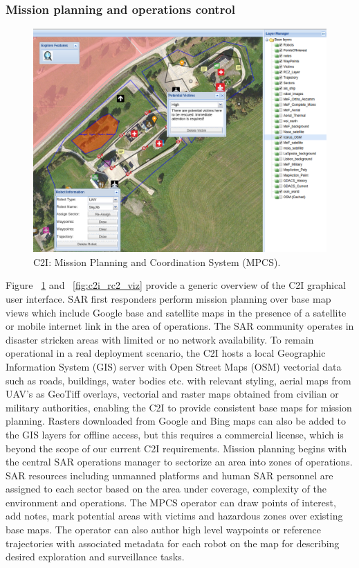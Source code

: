 \documentclass{article}
\begin{document}
\subsubsection{Mission planning and operations control}
\begin{figure} [h]
    \centering
    \includegraphics[width=\textwidth]{ROB-15-0035_fig6.png}
    \caption{C2I: Mission Planning and Coordination System (MPCS).}
    \label{fig:c2i_mpcs_viz}
\end{figure}
Figure ~\ref{fig:c2i_mpcs_viz} and ~\ref{fig:c2i_rc2_viz} provide a generic overview of the C2I graphical user interface.
SAR first responders perform mission planning over base map views which include Google base and satellite maps in the presence of a satellite or mobile internet link in the area of operations.
The SAR community operates in disaster stricken areas with limited or no network availability.
To remain operational in a real deployment scenario, the C2I hosts a local Geographic Information System (GIS) server with Open Street Maps (OSM) vectorial data such as roads, buildings, water bodies etc. with relevant styling, aerial maps from UAV's as GeoTiff overlays, vectorial and raster maps obtained from civilian or military authorities, enabling the C2I to provide consistent base maps for mission planning.
Rasters downloaded from Google and Bing maps can also be added to the GIS layers for offline access, but this requires a commercial license, which is beyond the scope of our current C2I requirements.
Mission planning begins with the central SAR operations manager to sectorize an area into zones of operations. SAR resources including unmanned platforms and human SAR personnel are assigned to each sector based on the area under coverage, complexity of the environment and operations. The MPCS operator can draw points of interest, add notes, mark potential areas with victims and hazardous zones over existing base maps. The operator can also author high level waypoints or reference trajectories with associated metadata for each robot on the map for describing desired exploration and surveillance tasks.
\end{document}
